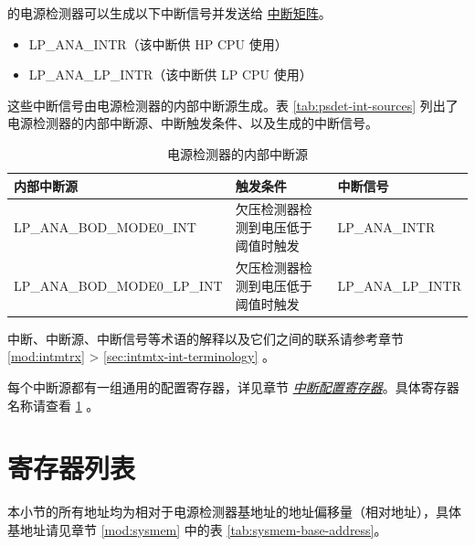 \documentclass[main\_\_CN.tex]{subfiles}
\begin{document}
\chipname{} 的电源检测器可以生成以下中断信号并发送给 \hyperref[mod:intmtrx]{中断矩阵}。

    \begin{itemize}
        \item LP\_ANA\_INTR（该中断供 HP CPU 使用）
        \item LP\_ANA\_LP\_INTR（该中断供 LP CPU 使用）
    \end{itemize}

这些中断信号由电源检测器的内部中断源生成。表 \ref{tab:psdet-int-sources} 列出了电源检测器的内部中断源、中断触发条件、以及生成的中断信号。

\begin{longtable}{ |l | l | l | }
\caption{电源检测器的内部中断源} \label{tab:psdet-int-sources}
\\ \hline
\rowcolor{lightgray}
\textbf{内部中断源} & \textbf{触发条件}  &  \textbf{中断信号}\\ \hline
\label{int:LPANABODMODE0INT}LP\_ANA\_BOD\_MODE0\_INT  & 欠压检测器检测到电压低于阈值时触发  & LP\_ANA\_INTR  \\ \hline
\label{int:LPANABODMODE0LPINT}LP\_ANA\_BOD\_MODE0\_LP\_INT  & 欠压检测器检测到电压低于阈值时触发  & LP\_ANA\_LP\_INTR  \\ \hline

\end{longtable}

\begin{tiplisting}
中断、中断源、中断信号等术语的解释以及它们之间的联系请参考章节 \ref{mod:intmtrx} \textit{} > \ref{sec:intmtx-int-terminology} \textit{}。
\end{tiplisting}


每个中断源都有一组通用的配置寄存器，详见章节 \hyperref[interrupt-config-registers]{\textit{中断配置寄存器}}。具体寄存器名称请查看 \ref{sec:psdet-reg-summ} \textit{}。



\newpage
\hypertarget{psdet-reg-summ}{}
\section{寄存器列表}
\label{sec:psdet-reg-summ}

本小节的所有地址均为相对于电源检测器基地址的地址偏移量（相对地址），具体基地址请见章节 \ref{mod:sysmem} \textit{} 中的表 \ref{tab:sysmem-base-address}。
\end{document}
